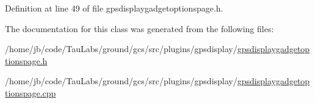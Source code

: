 \-Definition at line 49 of file gpsdisplaygadgetoptionspage.\-h.



\-The documentation for this class was generated from the following files\-:\begin{DoxyCompactItemize}
\item 
/home/jb/code/\-Tau\-Labs/ground/gcs/src/plugins/gpsdisplay/\hyperlink{gpsdisplaygadgetoptionspage_8h}{gpsdisplaygadgetoptionspage.\-h}\item 
/home/jb/code/\-Tau\-Labs/ground/gcs/src/plugins/gpsdisplay/\hyperlink{gpsdisplaygadgetoptionspage_8cpp}{gpsdisplaygadgetoptionspage.\-cpp}\end{DoxyCompactItemize}
